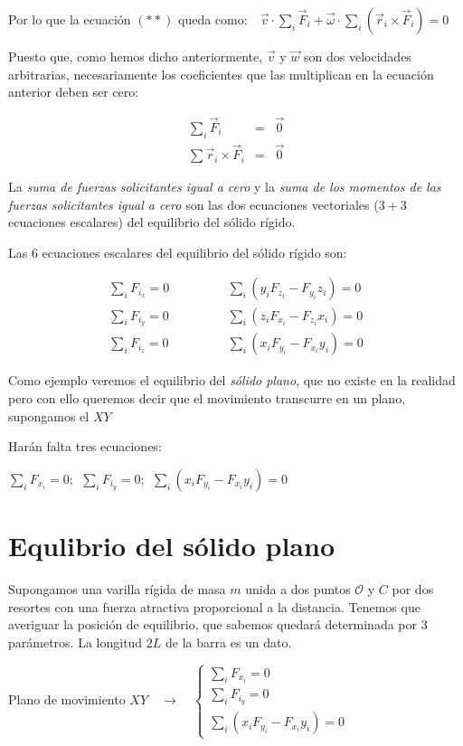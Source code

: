 Por lo que la ecuación $(**)$ queda como:$\quad \vec v \cdot \sum_i \vec F_i +\vec \omega \cdot \sum_i (\vec r_i \times \vec F_i)=0$

Puesto que, como hemos dicho anteriormente, $\vec v$ y $\vec w$ son dos velocidades arbitrarias, necesariamente los coeficientes que las multiplican en la ecuación anterior deben ser cero:

\begin{eqnarray}
\sum_i \vec F_i&=&\vec 0 \\
\sum \vec r_i \times \vec F_i&=&\vec 0
\end{eqnarray} 

La \emph{suma de fuerzas solicitantes igual a cero} y la \emph{suma de los momentos de las fuerzas solicitantes igual a cero} son las dos ecuaciones vectoriales ($3+3$ ecuaciones escalares) del equilibrio del sólido rígido.

Las $6$ ecuaciones escalares del equilibrio del sólido rígido son:

\begin{eqnarray*}
\sum_i F_{i_x}=0 &\quad \quad \quad & \sum_i (y_i F_{z_i}-F_{y_i}z_i)=0 \nonumber \\
\sum_i F_{i_y}=0 &\quad \quad \quad & \sum_i (z_i F_{x_i}-F_{z_i}x_i)=0 \nonumber \\
\sum_i F_{i_z}=0 &\quad \quad \quad & \sum_i (x_i F_{y_i}-F_{x_i}y_i)=0 \nonumber  	
\end{eqnarray*}

Como ejemplo veremos el equilibrio del \emph{sólido plano}, que no existe en la realidad pero con ello queremos decir que el movimiento transcurre en un plano, supongamos el $XY$ 

Harán falta tres ecuaciones: 

\hspace{2cm} $\displaystyle \sum_i F_{x_i}=0;\ \ \sum_i F_{i_y}=0; \ \ \sum_i (x_iF_{y_i}-F_{x_i}y_i)=0$
 

\section{Equlibrio del sólido plano}


Supongamos una varilla rígida de masa $m$ unida a dos puntos $\mathcal O$ y $C$ por dos resortes  con una fuerza atractiva proporcional a la distancia. Tenemos que averiguar la posición de equilibrio, que sabemos quedará determinada por 3 parámetros. La longitud $2L$ de la barra es un dato.

Plano de movimiento $XY \quad \to \quad \begin{cases}
 \sum_i F_{x_i}=0 \\ \sum_i F_{i_y}=0 \\ \sum_i (x_iF_{y_i}-F_{x_i}y_i)=0	 \end{cases}$
 
